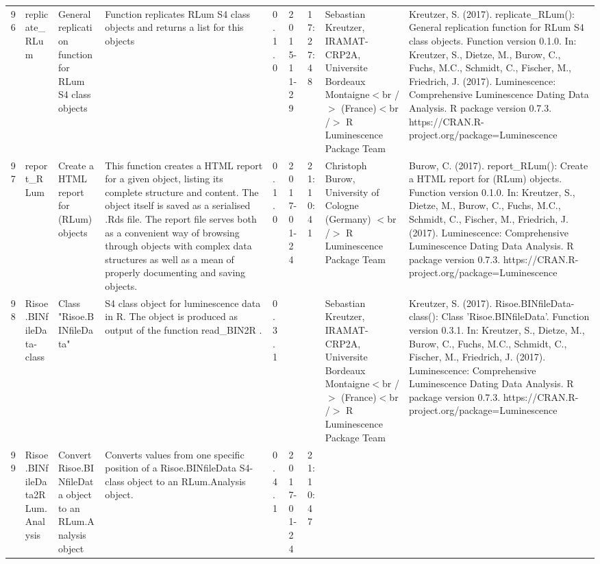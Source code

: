 \begin{table}[ht]
\begin{tabular}{rllllllll}
 \\ 
  96 & replicate\_RLum & General replication function for RLum S4 class objects & Function replicates RLum S4 class objects and returns a list for this objects & 0.1.0 & 2015-11-29 & 17:27:48
 & Sebastian Kreutzer, IRAMAT-CRP2A, Universite Bordeaux Montaigne$<$br /$>$ (France)$<$br /$>$  R Luminescence Package Team & Kreutzer, S. (2017). replicate\_RLum(): General replication function for RLum S4 class objects. Function version 0.1.0. In: Kreutzer, S., Dietze, M., Burow, C., Fuchs, M.C., Schmidt, C., Fischer, M., Friedrich, J. (2017). Luminescence: Comprehensive Luminescence Dating Data Analysis. R package version 0.7.3. https://CRAN.R-project.org/package=Luminescence
 \\ 
  97 & report\_RLum & Create a HTML report for (RLum) objects & This function creates a HTML report for a given object, listing its complete structure and content. The object itself is saved as a serialised .Rds file. The report file serves both as a convenient way of browsing through objects with  complex data structures as well as a mean of properly documenting and saving objects. & 0.1.0 & 2017-01-24 & 21:10:41
 & Christoph Burow, University of Cologne (Germany)  $<$br /$>$  R Luminescence Package Team & Burow, C. (2017). report\_RLum(): Create a HTML report for (RLum) objects. Function version 0.1.0. In: Kreutzer, S., Dietze, M., Burow, C., Fuchs, M.C., Schmidt, C., Fischer, M., Friedrich, J. (2017). Luminescence: Comprehensive Luminescence Dating Data Analysis. R package version 0.7.3. https://CRAN.R-project.org/package=Luminescence
 \\ 
  98 & Risoe.BINfileData-class & Class  "Risoe.BINfileData" & S4 class object for luminescence data in R. The object is produced as output of the function  read\_BIN2R . & 0.3.1
 &  &  & Sebastian Kreutzer, IRAMAT-CRP2A, Universite Bordeaux Montaigne$<$br /$>$ (France)$<$br /$>$  R Luminescence Package Team & Kreutzer, S. (2017). Risoe.BINfileData-class(): Class 'Risoe.BINfileData'. Function version 0.3.1. In: Kreutzer, S., Dietze, M., Burow, C., Fuchs, M.C., Schmidt, C., Fischer, M., Friedrich, J. (2017). Luminescence: Comprehensive Luminescence Dating Data Analysis. R package version 0.7.3. https://CRAN.R-project.org/package=Luminescence
 \\ 
  99 & Risoe.BINfileData2RLum.Analysis & Convert Risoe.BINfileData object to an RLum.Analysis object & Converts values from one specific position of a Risoe.BINfileData S4-class object to an RLum.Analysis object. & 0.4.1 & 2017-01-24 & 21:10:47

\end{tabular}
\end{table}
